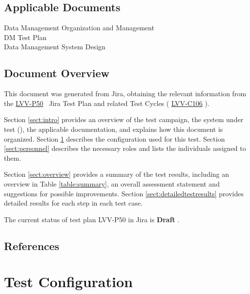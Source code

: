 \documentclass[DM,lsstdraft,STR,toc]{lsstdoc}
\begin{document}
\subsection{Applicable Documents}\label{applicable-documents}

 Data Management Organization and Management\\
 DM Test Plan\\
 Data Management System Design\\[2\baselineskip]


\subsection{Document Overview}
\label{sect:docoverview}

This document was generated from Jira, obtaining the relevant information from the 
\href{https://jira.lsstcorp.org/secure/Tests.jspa#/testPlan/LVV-P50}{LVV-P50}
~Jira Test Plan and related Test Cycles (
  \href{https://jira.lsstcorp.org/secure/Tests.jspa#/testCycle/LVV-C106}{LVV-C106}
).

Section \ref{sect:intro} provides an overview of the test campaign, the system under test (\product{}), the applicable documentation, and explains how this document is organized.
Section \ref{sect:configuration}  describes the configuration used for this test.
Section \ref{sect:personnel} describes the necessary roles and lists the individuals assigned to them.

Section \ref{sect:overview} provides a summary of the test results, including an overview in Table \ref{table:summary}, an overall assessment statement and suggestions for possible improvements.
Section \ref{sect:detailedtestresults} provides detailed results for each step in each test case.

The current status of test plan LVV-P50 in Jira is \textbf{ Draft }.

\subsection{References}
\label{sect:references}
\renewcommand{\refname}{}

\section{Test Configuration}
\label{sect:configuration}
\end{document}
